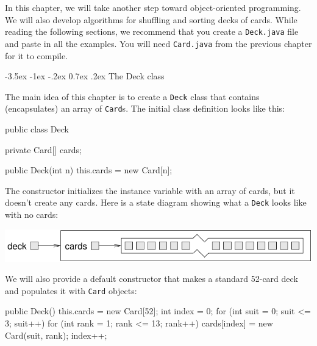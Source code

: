 \documentclass[12pt]{book}
\makeatletter
\theoremstyle{exercise}
\newcommand{\java}[1]{\verb"#1"}
\renewcommand{\section}{\@startsection {section}{1}{\z@}%
    {-3.5ex \@plus -1ex \@minus -.2ex}%
    {0.7ex \@plus.2ex}%
    {\normalfont\Large\bfseries}}
\newcommand{\java}[1]{\lstinline{#1}} %
\makeatother
\begin{document}
In this chapter, we will take another step toward object-oriented programming.
We will also develop algorithms for shuffling and sorting decks of cards.
While reading the following sections, we recommend that you create a {\tt Deck.java} file and paste in all the examples.
You will need {\tt Card.java} from the previous chapter for it to compile.




\section{The Deck class}
\label{deck}

The main idea of this chapter is to create a \java{Deck} class that contains (encapsulates) an array of \java{Card}s.
The initial class definition looks like this:

\begin{code}
public class Deck {
    private Card[] cards;

    public Deck(int n) {
        this.cards = new Card[n];
    }
}
\end{code}


The constructor initializes the instance variable with an array of cards, but it doesn't create any cards.
Here is a state diagram showing what a \java{Deck} looks like with no cards:

\begin{center}
\includegraphics{figs/deckobject.pdf}
\end{center}

We will also provide a default constructor that makes a standard 52-card deck and populates it with \java{Card} objects:

\begin{code}
    public Deck() {
        this.cards = new Card[52];
        int index = 0;
        for (int suit = 0; suit <= 3; suit++) {
            for (int rank = 1; rank <= 13; rank++) {
                cards[index] = new Card(suit, rank);
                index++;
            }
        }
    }
\end{code}
\end{document}
